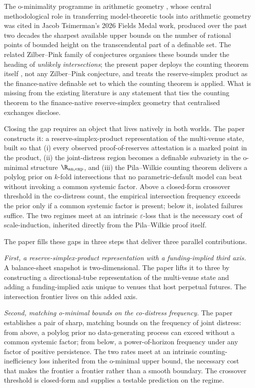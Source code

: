 The o-minimality programme in arithmetic geometry
\citep{PilaWilkie2006, vandenDries1998Tame,
Pila2011ManinMumford, BakkerKlinglerTsimerman2020,
PeterzilStarchenko2009}, whose central methodological role in
transferring model-theoretic tools into arithmetic geometry was
cited in Jacob Tsimerman's 2026 Fields Medal work, produced over
the past two decades the sharpest available upper bounds on the
number of rational points of bounded height on the transcendental
part of a definable set. The
related Zilber--Pink family of conjectures
\citep{Pink2005ZilberPink, Zilber2002} organises these bounds under
the heading of \emph{unlikely intersections}; the present paper
deploys the counting theorem itself \citep{PilaWilkie2006}, not any
Zilber--Pink conjecture, and treats the reserve-simplex product as
the finance-native definable set to which the counting theorem is
applied. What is missing from the existing literature is any
statement that ties the counting theorem to the finance-native
reserve-simplex geometry that centralised exchanges disclose.

Closing the gap requires an object that lives natively in both worlds.
The paper constructs it: a reserve-simplex-product representation of
the multi-venue state, built so that (i) every observed proof-of-reserves
attestation is a marked point in the product, (ii) the joint-distress
region becomes a definable subvariety in the o-minimal structure
$\R_{\text{an,exp}}$, and (iii) the Pila--Wilkie counting theorem
delivers a polylog prior on $k$-fold intersections that no
parametric-default model can beat without invoking a common systemic
factor. Above a closed-form crossover threshold in the co-distress
count, the empirical intersection frequency exceeds the prior only if
a common systemic factor is present; below it, isolated failures
suffice. The two regimes meet at an intrinsic $\varepsilon$-loss that
is the necessary cost of scale-induction, inherited directly from the
Pila--Wilkie proof itself.

The paper fills these gaps in three steps that deliver three parallel
contributions.

\emph{First, a reserve-simplex-product representation with a
funding-implied third axis.} A balance-sheet snapshot is
two-dimensional. The paper lifts it to three by constructing a
directional-tube representation of the multi-venue state and
adding a funding-implied axis unique to venues that host perpetual
futures. The intersection frontier lives on this added axis.

\emph{Second, matching o-minimal bounds on the co-distress
frequency.} The paper establishes a pair of sharp, matching bounds
on the frequency of joint distress: from above, a polylog prior no
data-generating process can exceed without a common systemic factor;
from below, a power-of-horizon frequency under any factor of
positive persistence. The two rates meet at an intrinsic
counting-inefficiency loss inherited from the o-minimal upper bound,
the necessary cost that makes the frontier a frontier rather than
a smooth boundary. The crossover threshold is closed-form and
supplies a testable prediction on the regime.

